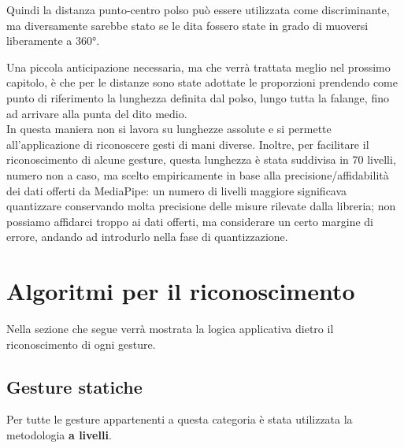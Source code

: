 \begin{multicols}{2}
\begin{multicolfigure}
    \end{multicolfigure} 
\end{multicols}
\vspace{+ 15 px}

\noindent Quindi la distanza punto-centro polso può essere utilizzata come discriminante, ma diversamente sarebbe stato se le dita fossero state in grado di muoversi liberamente a 360°.\\
\newpage

\noindent Una piccola anticipazione necessaria, ma che verrà trattata meglio nel prossimo capitolo, è che per le distanze sono state adottate le proporzioni 
prendendo come punto di riferimento la lunghezza definita dal polso, lungo tutta la falange, fino ad arrivare alla punta del dito medio.\\
In questa maniera non si lavora su lunghezze assolute e si permette all'applicazione di riconoscere gesti di mani diverse. 
Inoltre, per facilitare il riconoscimento di alcune gesture, questa lunghezza è stata suddivisa in 70 livelli, numero non a caso, 
ma scelto empiricamente in base alla precisione/affidabilità dei dati offerti da MediaPipe: un numero di livelli 
maggiore significava quantizzare conservando molta precisione delle misure rilevate dalla libreria; 
non possiamo affidarci troppo ai dati offerti, ma considerare un certo margine di errore, andando ad introdurlo nella fase di quantizzazione. 

\newpage
\section{Algoritmi per il riconoscimento}
Nella sezione che segue verrà mostrata la logica applicativa dietro il riconoscimento di ogni gesture.

\subsection{Gesture statiche}
Per tutte le gesture appartenenti a questa categoria è stata utilizzata la metodologia \textbf{a livelli}.
